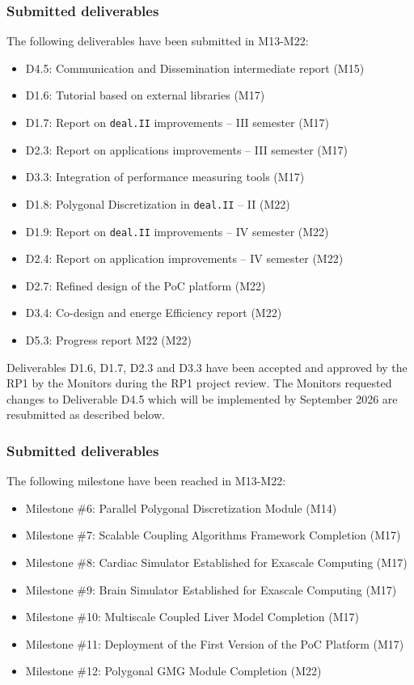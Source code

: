 \documentclass[a4paper,12pt, numbers]{article}
\newcommand{\dealii}{\texttt{deal.II}}
\begin{document}
\subsubsection*{Submitted deliverables}

The following deliverables have been submitted in M13-M22:
\begin{itemize}
	\item D4.5: Communication and Dissemination intermediate report (M15)
	\item D1.6: Tutorial based on external libraries (M17)
	\item D1.7: Report on \dealii{} improvements -- III semester (M17)
	\item D2.3: Report on applications improvements -- III semester (M17)
	\item D3.3: Integration of performance measuring tools (M17)
	\item D1.8: Polygonal Discretization in \dealii{} -- II (M22)
	\item D1.9: Report on \dealii{} improvements -- IV semester (M22)
	\item D2.4: Report on application improvements -- IV semester (M22)
	\item D2.7: Refined design of the PoC platform (M22)
	\item D3.4: Co-design and energe Efficiency report (M22)
	\item D5.3: Progress report M22 (M22)
\end{itemize}

Deliverables D1.6, D1.7, D2.3 and D3.3 have been accepted and approved by the RP1 by the Monitors during the RP1 project review. The Monitors requested changes to Deliverable D4.5 which will be implemented by September 2026 are resubmitted as described below.

\subsubsection*{Submitted deliverables}

The following milestone have been reached in M13-M22:
\begin{itemize}
	\item Milestone \#6: Parallel Polygonal Discretization Module (M14)
	\item Milestone \#7: Scalable Coupling Algorithms Framework Completion (M17)
	\item Milestone \#8: Cardiac Simulator Established for Exascale Computing (M17)
	\item Milestone \#9: Brain Simulator Established for Exascale Computing (M17)
	\item Milestone \#10: Multiscale Coupled Liver Model Completion (M17)
	\item Milestone \#11: Deployment of the First Version of the PoC Platform (M17)
	\item Milestone \#12: Polygonal GMG Module Completion (M22)
\end{itemize}
\end{document}
